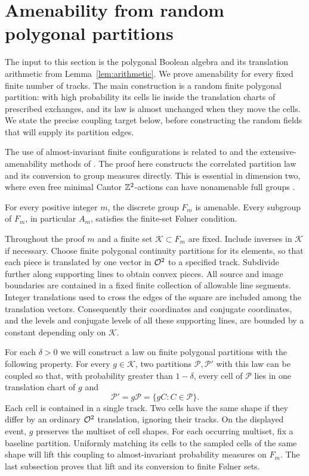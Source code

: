 \section{Amenability from random polygonal partitions}\label{sec:amenability}

The input to this section is the polygonal Boolean algebra and its translation
arithmetic from Lemma~\ref{lem:arithmetic}.  We prove amenability for every
fixed finite number of tracks.  The main construction is a random finite
polygonal partition: with high probability its cells lie inside the translation
charts of prescribed exchanges, and its law is almost unchanged when they move the
cells.  We state the precise coupling target below, before constructing the
random fields that will supply its partition edges.

The use of almost-invariant finite configurations is related to
\cite[Theorem~C]{JuschenkoMonod2013} and the extensive-amenability
methods of \cite{JuschenkoMatteBonMonodDeLaSalle2018}.  The proof here
constructs the correlated partition law and its conversion to group
measures directly.  This is essential in dimension two, where even
free minimal Cantor $\mathbb Z^2$-actions can have nonamenable full
groups \cite[Theorem~1]{ElekMonod2013}.

\begin{theorem}\label{thm:amenability}
For every positive integer $m$, the discrete group $F_m$ is amenable.  Every
subgroup of $F_m$, in particular $A_m$, satisfies the finite-set F\o lner
condition.
\end{theorem}

Throughout the proof $m$ and a finite set $\mathcal K\subset F_m$ are fixed.
Include inverses in $\mathcal K$ if necessary.  Choose finite polygonal
continuity partitions for its elements, so that each piece is translated by
one vector in $\mathcal O^2$ to a specified track.  Subdivide further along supporting
lines to obtain convex pieces.  All source and image boundaries are contained
in a fixed finite collection of allowable line segments.  Integer translations
used to cross the edges of the square are included among the translation
vectors.  Consequently their coordinates and conjugate coordinates, and the
levels and conjugate levels of all these supporting lines, are bounded by a
constant depending only on $\mathcal K$.

For each $\delta>0$ we will construct a law on finite polygonal partitions
with the following property.  For every $g\in\mathcal K$, two partitions
$\mathcal P,\mathcal P'$ with this law can be coupled so that, with
probability greater than $1-\delta$, every cell of $\mathcal P$ lies in
one translation chart of $g$ and
\[
 \mathcal P'=g\mathcal P=\{gC:C\in\mathcal P\}.
\]
Each cell is contained in a single track.  Two cells have the same shape
if they differ by an ordinary $\mathcal O^2$ translation, ignoring their tracks.
On the displayed event, $g$ preserves the multiset of cell shapes.
For each occurring multiset, fix a baseline partition.  Uniformly matching
its cells to the sampled cells of the same shape will lift this coupling
to almost-invariant probability measures on $F_m$.  The last subsection
proves that lift and its conversion to finite F\o lner sets.

